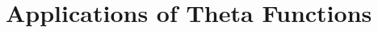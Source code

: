 \documentclass[../../main.tex]{subfiles}
\begin{document}
\chapter{Applications of Theta Functions}
\end{document}
